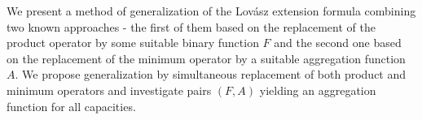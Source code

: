 
We present a method of generalization of the Lov\'asz extension formula combining two known approaches - the first of them based on the replacement of the product operator by some suitable binary function $F$ and the second one based on the replacement of the minimum operator by a suitable aggregation function $A$. We propose generalization by simultaneous replacement of both product and minimum operators and investigate pairs $(F,A)$ yielding an aggregation function for all capacities. 

